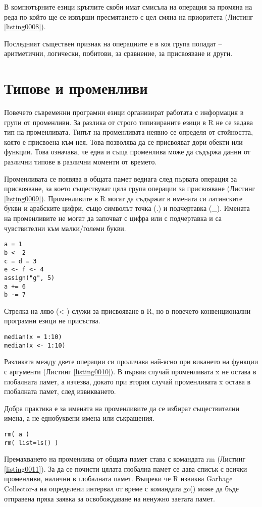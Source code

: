 В компютърните езици кръглите скоби имат смисъла на операция за промяна на реда по който ще се извърши пресмятането с цел смяна на приоритета (Листинг \ref{listing0008}).

Последният съществен признак на операциите е в коя група попадат – аритметични, логически, побитови, за сравнение, за присвояване и други.

\section{Типове и променливи}

Повечето съвременни програмни езици организират работата с информация в групи от променливи. За разлика от строго типизираните езици в R не се задава тип на променливата. Типът на променливата неявно се определя от стойността, която е присвоена към нея. Това позволява да се присвояват дори обекти или функции. Това означава, че една и съща променлива може да съдържа данни от различни типове в различни моменти от времето. 

Променливата се появява в общата памет веднага след първата операция за присвояване, за което съществуват цяла група операции за присвояване (Листинг \ref{listing0009}). Променливите в R могат да съдържат в имената си латинските букви и арабските цифри, също символът точка (.) и подчертавка (\_). Имената на променливите не могат да започват с цифра или с подчертавка и са чувствителни към малки/големи букви. 

\begin{lstlisting}[caption=Операции за присвояване, label=listing0009]
a = 1
b <- 2
c = d = 3
e <- f <- 4
assign("g", 5)
a += 6
b -= 7
\end{lstlisting}

Стрелка на ляво (<-) служи за присвояване в R, но в повечето конвенционални програмни езици не присъства. 

\begin{lstlisting}[caption=Алтернативи за операцията присвояване, label=listing0010]
median(x = 1:10)
median(x <- 1:10)
\end{lstlisting}

Разликата между двете операции си проличава най-ясно при викането на функции с аргументи (Листинг \ref{listing0010}). В първия случай променливата x не остава в глобалната памет, а изчезва, докато при втория случай променливата x остава в глобалната памет, след извикването. 

Добра практика е за имената на променливите да се избират съществителни имена, а не еднобуквени имена или съкращения. 

\begin{lstlisting}[caption=Премахване на променливи от глобалната памет, label=listing0011]
rm( a )
rm( list=ls() )
\end{lstlisting}

Премахването на променлива от общата памет става с командата rm (Листинг \ref{listing0011}). За да се почисти цялата глобална памет се дава списък с всички променливи, налични в глобалната памет. Въпреки че R извиква Garbage Collector-а на определени интервал от време с командата gc() може да бъде отправена пряка заявка за освобождаване на ненужно заетата памет. 
